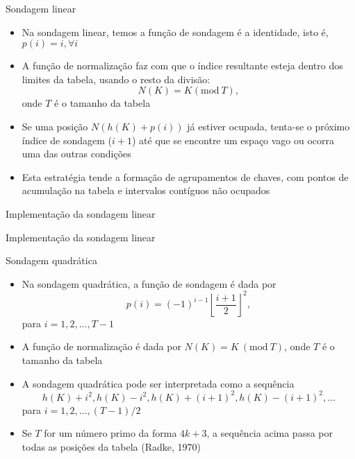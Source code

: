 \begin{frame}{Sondagem linear} 

	\begin{itemize}
		\item Na sondagem linear, temos a função de sondagem é a identidade, isto é,
            $p(i) = i, \forall i$

        \item A função de normalização faz com que o índice resultante esteja dentro dos 
            limites da tabela, usando o resto da divisão:
            \[
                N(K) = K (\mbox{mod}\ T), \]
            onde $T$ é o tamanho da tabela

		\item Se uma posição $N(h(K) + p(i))$ já estiver ocupada, tenta-se o próximo índice de 
            sondagem ($i + 1$) até que se encontre um espaço vago ou ocorra uma das outras 
            condições

		\item Esta estratégia tende a formação de agrupamentos de chaves, com pontos de 
            acumulação na tabela e intervalos contíguos não ocupados
	\end{itemize}

\end{frame}



\begin{frame}[fragile]{Implementação da sondagem linear}
\end{frame}

\begin{frame}[fragile]{Implementação da sondagem linear}
\end{frame}

\begin{frame}{Sondagem quadrática} 

	\begin{itemize}
		\item Na sondagem quadrática, a função de sondagem é dada por
		\[
            p(i) = (-1)^{i-1}\left\lfloor\frac{i+1}{2}\right\rfloor^2,
        \]
		para $i = 1, 2, \ldots, T - 1$

        \item A função de normalização é dada por $N(K) = K\ (\mbox{mod}\ T)$, onde $T$ é o 
            tamanho da tabela

		\item A sondagem quadrática pode ser interpretada como a sequência 
        \[
            h(K) + i^2, h(K) - i^2, h(K) + (i + 1)^2, h(K) - (i + 1)^2, \ldots
        \]
        para $i = 1, 2, \ldots, (T - 1)/2$ 

		\item Se $T$ for um número primo da forma $4k+3$, a sequência acima passa por todas 
            as posições da tabela (Radke, 1970)
	\end{itemize}

\end{frame}

